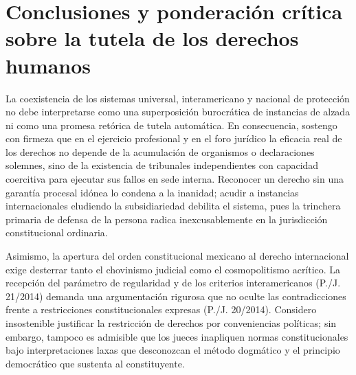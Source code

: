 \documentclass[12pt,spanish,letterpaper,oneside]{article}
\begin{document}
\clearpage
\section[Conclusiones]{Conclusiones y ponderaci\'on cr\'itica sobre la tutela de los derechos humanos}

La coexistencia de los sistemas universal, interamericano y nacional de protecci\'on no debe interpretarse como una superposici\'on burocr\'atica de instancias de alzada ni como una promesa ret\'orica de tutela autom\'atica. En consecuencia, sostengo con firmeza que en el ejercicio profesional y en el foro jur\'idico la eficacia real de los derechos no depende de la acumulaci\'on de organismos o declaraciones solemnes, sino de la existencia de tribunales independientes con capacidad coercitiva para ejecutar sus fallos en sede interna. Reconocer un derecho sin una garant\'ia procesal id\'onea lo condena a la inanidad; acudir a instancias internacionales eludiendo la subsidiariedad debilita el sistema, pues la trinchera primaria de defensa de la persona radica inexcusablemente en la jurisdicci\'on constitucional ordinaria.

Asimismo, la apertura del orden constitucional mexicano al derecho internacional exige desterrar tanto el chovinismo judicial como el cosmopolitismo acr\'itico. La recepci\'on del par\'ametro de regularidad y de los criterios interamericanos (P./J. 21/2014) demanda una argumentaci\'on rigurosa que no oculte las contradicciones frente a restricciones constitucionales expresas (P./J. 20/2014). Considero insostenible justificar la restricci\'on de derechos por conveniencias pol\'iticas; sin embargo, tampoco es admisible que los jueces inapliquen normas constitucionales bajo interpretaciones laxas que desconozcan el m\'etodo dogm\'atico y el principio democr\'atico que sustenta al constituyente.
\end{document}
